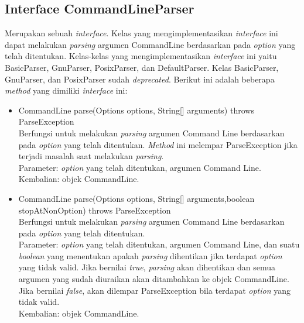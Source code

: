 \subsection{Interface CommandLineParser}
\label{subsec:commandlineparser}
Merupakan sebuah \textit{interface}. Kelas yang mengimplementasikan \textit{interface} ini dapat melakukan \textit{parsing} argumen CommandLine berdasarkan pada \textit{option} yang telah ditentukan. Kelas-kelas yang mengimplementasikan \textit{interface} ini yaitu BasicParser, GnuParser, PosixParser, dan DefaultParser. Kelas BasicParser, GnuParser, dan PosixParser sudah \textit{deprecated}. Berikut ini adalah beberapa \textit{method} yang dimiliki \textit{interface} ini: 
\begin{itemize}
\item CommandLine parse(Options options, String[] arguments) throws ParseException\\
Berfungsi untuk melakukan \textit{parsing} argumen Command Line berdasarkan pada \textit{option} yang telah ditentukan. \textit{Method} ini melempar ParseException jika terjadi masalah saat melakukan \textit{parsing}.\\
Parameter: \textit{option} yang telah ditentukan, argumen Command Line.\\
Kembalian: objek CommandLine.

\item CommandLine parse(Options options, String[] arguments,boolean stopAtNonOption) throws ParseException\\
Berfungsi untuk melakukan \textit{parsing} argumen Command Line berdasarkan pada \textit{option} yang telah ditentukan.\\
Parameter: \textit{option} yang telah ditentukan, argumen Command Line, dan suatu \textit{boolean} yang menentukan apakah \textit{parsing} dihentikan jika terdapat \textit{option} yang tidak valid. Jika bernilai \textit{true}, \textit{parsing} akan dihentikan dan semua argumen yang sudah diuraikan akan ditambahkan ke objek CommandLine. Jika bernilai \textit{false}, akan dilempar ParseException bila terdapat \textit{option} yang tidak valid.\\
Kembalian: objek CommandLine.
\end{itemize}


